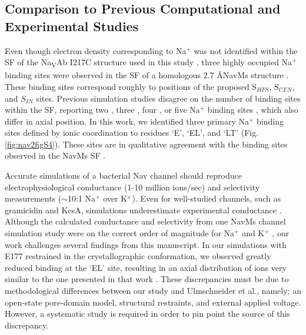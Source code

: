 \begin{refsection}
\subsection{Comparison to Previous Computational and Experimental Studies}
Even though electron density corresponding to Na$^+$ was not identified within the SF of the Na\textsubscript{V}Ab I217C structure used in this study \cite{Payandeh:2012ib}, three highly occupied Na$^+$ binding sites were observed in the SF of a homologous 2.7 \AA NavMs structure \cite{Naylor:2016cu}. These binding sites correspond roughly to positions of the proposed S$_{HFS}$, S$_{CEN}$, and $S_{IN}$ sites. Previous simulation studies disagree on the number of binding sites within the SF, reporting two \cite{Chakrabarti:2013kd,Furini:2012jl}, three \cite{Boiteux:2014ut,Corry:2012ge}, four \cite{Domene:2015kj,Ke:2014fy}, or five Na$^+$ binding sites \cite{Stock:2013cg,Ulmschneider:2013da}, which also differ in axial position. In this work, we identified three primary Na$^+$ binding sites defined by ionic coordination to residues `E', `EL', and `LT' (Fig. \ref{fig:nav2figS4}). These sites are in qualitative agreement with the binding sites observed in the NavMs SF \cite{Naylor:2016cu}. 

Accurate simulations of a bacterial Nav channel should reproduce electrophysiological conductance (1-10 million ions/sec) and selectivity measurements ($\sim$10:1 Na$^+$ over K$^+$). Even for well-studied channels, such as gramicidin and KcsA, simulations underestimate experimental conductance \cite{Allen:2004vs,Jensen:2013gn}. Although the calculated conductance and selectivity from one NavMs channel simulation study were on the correct order of magnitude for Na$^+$ and K$^+$ \cite{Ulmschneider:2013da}, our work challenges several findings from this manuscript. In our simulations with E177 restrained in the crystallographic conformation, we observed greatly reduced binding at the `EL' site, resulting in an axial distribution of ions very similar to the one presented in that work \cite{Ulmschneider:2013da}. These discrepancies must be due to methodological differences between our study and Ulmschneider et al., namely; an open-state pore-domain model, structural restraints, and external applied voltage. However, a systematic study is required in order to pin point the source of this discrepancy. 


\end{refsection}
